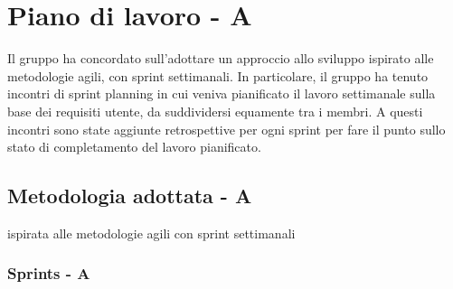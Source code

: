

\section{Piano di lavoro - A}
Il gruppo ha concordato sull'adottare un approccio allo sviluppo ispirato alle metodologie agili, con sprint settimanali. In particolare, il gruppo ha tenuto incontri di sprint planning
in cui veniva pianificato il lavoro settimanale sulla base dei requisiti utente, da suddividersi equamente tra i membri. A questi incontri sono state aggiunte retrospettive
per ogni sprint per fare il punto sullo stato di completamento del lavoro pianificato.\\

\subsection{Metodologia adottata - A}
ispirata alle metodologie agili con sprint settimanali

\subsubsection{Sprints - A}







\newpage





